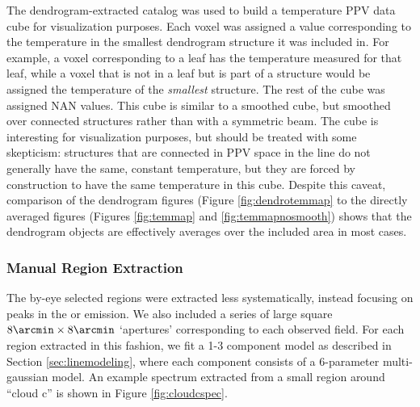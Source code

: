The dendrogram-extracted catalog was used to build a temperature PPV data cube
for visualization purposes.  Each voxel was assigned a value corresponding to
the temperature in the smallest dendrogram structure it was included in.  For
example, a voxel corresponding to a leaf has the temperature measured for that
leaf, while a voxel that is not in a leaf but is part of a structure would be
assigned the temperature of the \emph{smallest} structure.  The rest of the
cube was assigned NAN values.  This cube is similar to a smoothed cube, but
smoothed over connected structures rather than with a symmetric beam.  The cube
is interesting for visualization purposes, but should be treated with some
skepticism: structures that are connected in PPV space in the \threeohthree
line do not generally have the same, constant temperature, but they are forced
by construction to have the same temperature in this cube.  Despite this
caveat, comparison of the dendrogram figures (Figure \ref{fig:dendrotemmap} to
the directly averaged figures (Figures \ref{fig:temmap} and
\ref{fig:temmapnosmooth}) shows that the dendrogram objects are effectively
averages over the included area in most cases.

\subsubsection{Manual Region Extraction}
\label{sec:byeye}
The by-eye selected regions were extracted less systematically, instead
focusing on peaks in the \threeohthree or \threetwoone emission.  We also
included a series of large square $8\arcmin \times 8\arcmin$ `apertures'
corresponding to each observed field.  For each region extracted in this
fashion, we fit a 1-3 component model as described in Section
\ref{sec:linemodeling}, where each component consists of a 6-parameter
multi-gaussian model.  An example spectrum extracted from a small region
around ``cloud c'' is shown in Figure \ref{fig:cloudcspec}.

